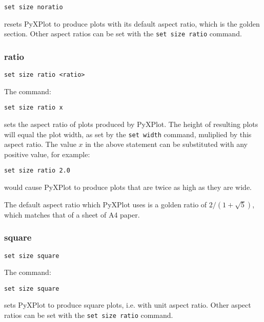 \documentclass[a4paper,onecolumn,11pt]{book}
\begin{document}
\begin{verbatim}
set size noratio
\end{verbatim}

\noindent resets PyXPlot to produce plots with its default aspect ratio, which is the
golden section. Other aspect ratios can be set with the {\tt set size ratio}
command.


\subsubsection{ratio}

\begin{verbatim}
set size ratio <ratio>
\end{verbatim}

The command:

\begin{verbatim}
set size ratio x
\end{verbatim}

\noindent sets the aspect ratio of plots produced by PyXPlot.  The height of resulting
plots will equal the plot width, as set by the {\tt set width} command,
muliplied by this aspect ratio. The value $x$ in the above statement can be
substituted with any positive value, for example:

\begin{verbatim}
set size ratio 2.0
\end{verbatim}

\noindent would cause PyXPlot to produce plots that are twice as high as they are wide.

The default aspect ratio which PyXPlot uses is a golden ratio of
$2/(1+\sqrt{5})$, which matches that of a sheet of A4 paper.


\subsubsection{square}

\begin{verbatim}
set size square
\end{verbatim}

The command:

\begin{verbatim}
set size square
\end{verbatim}

\noindent sets PyXPlot to produce square plots, i.e. with unit aspect ratio. Other aspect
ratios can be set with the {\tt set size ratio} command.
\end{document}
